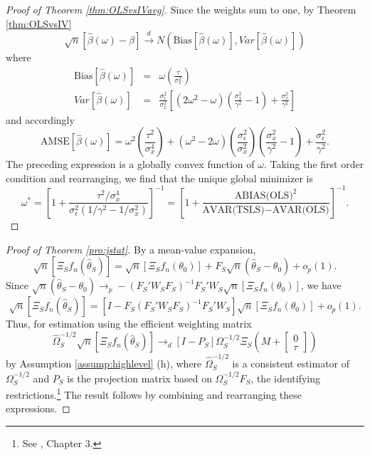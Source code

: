 \begin{proof}[Proof of Theorem \ref{thm:OLSvsIVavg}]
	Since the weights sum to one, by Theorem \ref{thm:OLSvsIV}
$$\sqrt{n}\left[\widehat{\beta}(\omega) - \beta \right]  \overset{d}{\rightarrow}  N\left(\mbox{Bias}\left[\widehat{\beta}(\omega)\right], Var\left[\widehat{\beta}(\omega)\right] \right)$$
where
\begin{eqnarray*}
	\mbox{Bias}\left[\widehat{\beta}(\omega)\right] &=& \omega \left( \frac{\tau}{\sigma_x^2} \right) \\
	 Var\left[\widehat{\beta}(\omega)\right] &=&  \frac{\sigma_\epsilon^2}{\sigma_x^2} \left[(2\omega^2 - \omega)\left( \frac{\sigma_x^2}{\gamma^2} - 1\right)+\frac{\sigma_x^2}{\gamma^2} \right]
\end{eqnarray*}
and accordingly
	$$\mbox{AMSE}\left[\widehat{\beta}(\omega) \right] =  \omega^2 \left(\frac{\tau^2}{\sigma_x^4} \right) + (\omega^2 - 2 \omega)\left(\frac{\sigma_\epsilon^2}{\sigma_x^2}\right)\left( \frac{\sigma_x^2}{\gamma^2} - 1\right) + \frac{\sigma_\epsilon^2}{\gamma^2}.$$
The preceding expression is a globally convex function of $\omega$. 
Taking the first order condition and rearranging, we find that the unique global minimizer is
$$\omega^* = \left[1 + \frac{\tau^2/\sigma_x^4}{\sigma_\epsilon^2(1/\gamma^2 - 1/\sigma_x^2)}\right]^{-1} = \left[1 + \frac{\mbox{ABIAS(OLS)}^2}{\mbox{AVAR(TSLS)}-\mbox{AVAR(OLS)}} \right]^{-1}.$$
\end{proof}


\begin{proof}[Proof of Theorem \ref{pro:jstat}]
By a mean-value expansion,
	$$\sqrt{n}\left[\Xi_S f_n\left(\widehat{\theta}_S\right)\right]  = \sqrt{n}\left[\Xi_S f_n(\theta_0)\right] + F_S  \sqrt{n}\left(\widehat{\theta}_S - \theta_0\right) + o_p(1).$$
Since $\sqrt{n}\left(\widehat{\theta}_S - \theta_0\right) \rightarrow_p -\left(F_S' W_S F_S  \right)^{-1}F_S'W_S\sqrt{n}\left[\Xi_S f_n(\theta_0)\right]$, we have
	$$\sqrt{n}\left[\Xi_S f_n(\widehat{\theta}_S)\right] = \left[I - F_S\left(F_S' W_S F_S  \right)^{-1}F_S'W_S\right] \sqrt{n}\left[\Xi_S f_n(\theta_0)\right] + o_p(1).$$
Thus, for estimation using the efficient weighting matrix 
$$\widehat{\Omega}^{-1/2}_S \sqrt{n}\left[\Xi_S f_n\left(\widehat{\theta}_S\right)\right] \rightarrow_d\left[I - P_S\right] \Omega_S^{-1/2}\Xi_S\left(M + \left[\begin{array}{c}0\\ \tau \end{array} \right] \right)$$
by Assumption \ref{assump:highlevel} (h), where $\widehat{\Omega}^{-1/2}_S$ is a consistent estimator of $\Omega_S^{-1/2}$ and $P_S$ is the projection matrix based on $\Omega^{-1/2}_S F_S$, the identifying restrictions.\footnote{See \cite{Hallbook}, Chapter 3.} The result follows by combining and rearranging these expressions.
\end{proof}



